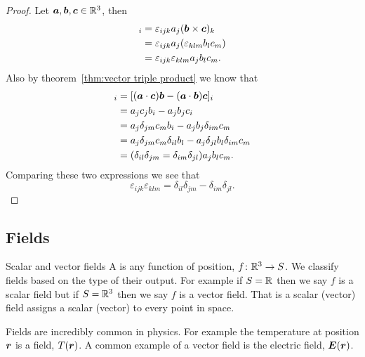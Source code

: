 \documentclass[a4paper]{article}
\begin{document}
    \begin{proof}
        Let \(\bm{a}, \bm{b}, \bm{c}\in\mathbb{R}^3\), then
        \begin{align*}
            [\vv{a}\times(\vv{b}\times\vv{c})]_i &= \varepsilon_{ijk}a_j(\vv{b}\times\vv{c})_k\\
            &= \varepsilon_{ijk}a_j(\varepsilon_{klm}b_lc_m)\\
            &= \varepsilon_{ijk}\varepsilon_{klm}a_jb_lc_m.
        \end{align*}
        Also by theorem~\ref{thm:vector triple product} we know that
        \begin{align*}
            [\vv{a}\times(\vv{b}\times\vv{c})]_i &= [(\vv{a}\cdot\vv{c})\vv{b} - (\vv{a}\cdot\vv{b})\vv{c}]_i\\
            &= a_jc_jb_i - a_jb_jc_i\\
            &= a_j\delta_{jm}c_mb_i - a_jb_j\delta_{im}c_m\\
            &= a_j\delta_{jm}c_m\delta_{il}b_l - a_j\delta_{jl}b_l\delta_{im}c_m\\
            &= (\delta_{il}\delta_{jm} = \delta_{im}\delta_{jl})a_jb_lc_m.
        \end{align*}
        Comparing these two expressions we see that
        \[\varepsilon_{ijk}\varepsilon_{klm} = \delta_{il}\delta_{jm} - \delta_{im}\delta_{jl}.\]
    \end{proof}
    
    \subsection{Fields}
    \begin{definition}{Scalar and vector fields}{}
        A  is any function of position, \(f\colon\mathbb{R}^3\to S\).
        We classify fields based on the type of their output.
        For example if \(S = \mathbb{R}\) then we say \(f\) is a scalar field but if \(S = \mathbb{R}^3\) then we say \(f\) is a vector field.
        That is a scalar (vector) field assigns a scalar (vector) to every point in space.
    \end{definition}
    Fields are incredibly common in physics.
    For example the temperature at position \(\bm{r}\) is a field, \(T(\bm{r})\).
    A common example of a vector field is the electric field, \(\bm{E}(\bm{r})\).
    
\end{document}
